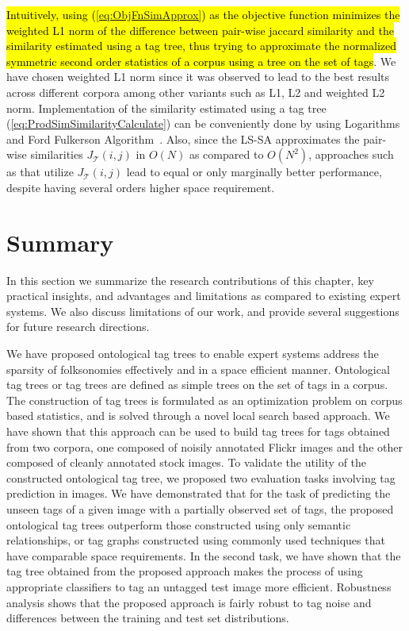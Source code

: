 \hl{Intuitively, using ({\ref{eq:ObjFnSimApprox}}) as the objective function minimizes the weighted L1 norm of the difference between pair-wise jaccard similarity and the similarity estimated using a tag tree, thus trying to approximate the normalized symmetric second order statistics of a corpus using a tree on the set of tags}. We have chosen weighted L1 norm since it was observed to lead to the best results across different corpora among other variants such as L1, L2 and weighted L2 norm. Implementation of the similarity estimated using a tag tree (\ref{eq:ProdSimSimilarityCalculate}) can be conveniently done by using Logarithms and Ford Fulkerson Algorithm~\cite{ford2010flows}. Also, since the LS-SA approximates the pair-wise similarities $J_{\mathcal{T}}(i,j)$ in $O(N)$ as compared to $O(N^2)$, approaches such as {\cite{sigurbjornsson2008flickr}} that utilize $J_{\mathcal{T}}(i,j)$ lead to equal or only marginally better performance, despite having several orders higher space requirement. \\


\section{Summary}

In this section we summarize the research contributions of this chapter, key practical insights, and advantages and limitations as compared to existing expert systems. We also discuss limitations of our work, and provide several suggestions for future research directions. 

We have proposed ontological tag trees to enable expert systems address the sparsity of folksonomies effectively and in a space efficient manner. Ontological tag trees or tag trees are defined as simple trees on the set of tags in a corpus. The construction of tag trees is formulated as an optimization problem on corpus based statistics, and is solved through a novel local search based approach. We have shown that this approach can be used to build tag trees for tags obtained from two corpora, one composed of noisily annotated Flickr images and the other composed of cleanly annotated stock images. To validate the utility of the constructed ontological tag tree, we proposed two evaluation tasks involving tag prediction in images.  We have demonstrated that for the task of predicting the unseen tags of a given image with a partially observed set of tags, the proposed ontological tag trees outperform those constructed using only semantic relationships, or tag graphs constructed using commonly used techniques that have comparable space requirements. In the second task, we have shown that the tag tree obtained from the proposed approach makes the process of using appropriate classifiers to tag an untagged test image more efficient. Robustness analysis shows that the proposed approach is fairly robust to tag noise and differences between the training and test set distributions.

